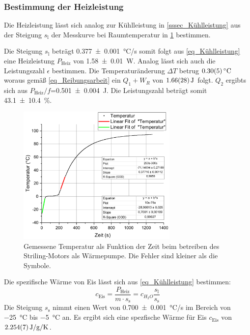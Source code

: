 \documentclass[
	a4paper,
	12pt,
	pagesize,
	ngerman
]{scrartcl}
\begin{document}
	
	
	\subsubsection{Bestimmung der Heizleistung}
	Die Heizleistung lässt sich analog zur Kühlleistung in \cref{sssec_Kühlleistung} aus der Steigung $s_\text{l}$ der Messkurve bei Raumtemperatur in \cref{fig_Waerm} bestimmen.
	
	Die Steigung $s_\text{l}$ beträgt \SI{0,377+-0,001}{\degreeCelsius/s} somit folgt aus \cref{eq_Kühlleistung} eine Heizleistung $P_\text{Heiz}$ von \SI{1,58+-0,01}{W}.
	Analog lässt sich auch die Leistungszahl $\epsilon$ bestimmen. 
	Die Temperaturänderung $\Delta{T}$ betrug $\SI{0,3+-0,05}{\degreeCelsius}$ woraus gemäß \cref{eq_Reibungsarbeit} ein $Q_1+W_R$ von $\SI{1,66+-0,28}{J}$ folgt. 
	$Q_2$ ergibts sich aus $P_\text{Heiz}/f$=\SI{0,501+-0,004}{J}. %
	Die Leistungszahl beträgt somit \SI{43,1+-10,4}{\%}.
	\begin{figure}[H]
		\includegraphics[width=0.7\textwidth]{Waerm}
		\centering
		\caption{Gemessene Temperatur als Funktion der Zeit beim betreiben des Striling-Motors als Wärmepumpe. Die Fehler sind kleiner als die Symbole.}
		\label{fig_Waerm}
		\centering
	\end{figure}
	Die spezifische Wärme von Eis lässt sich aus \cref{eq_Kühlleistung} bestimmen:
	\begin{equation}
		c_\text{Eis} = \frac{P_\text{Heiz}}{m \cdot s_\text{s}} = c_{H_2O} \frac{s_\text{l}}{s_\text{s}}
	\end{equation} 
	Die Steigung $s_\text{s}$ nimmt einen Wert von \SI{0,700+-0,001}{\degreeCelsius/s} im Bereich von \SI{-25}{\degreeCelsius} bis \SI{-5}{\degreeCelsius} an. 
	Es ergibt sich eine spezfische Wärme für Eis $c_\text{Eis}$ von $\SI{2,254+-0,007}{J/g/K}$.
\end{document}

